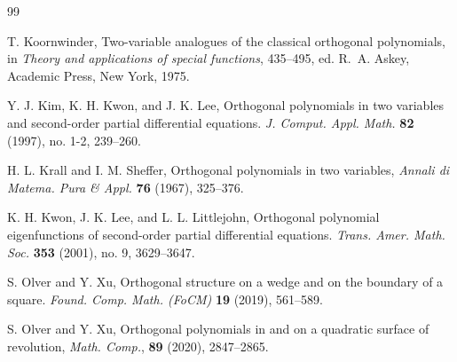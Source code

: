 \documentclass{amsart}
\theoremstyle{remark}
\begin{document}
\begin{thebibliography}{99}
 

        T. Koornwinder, 
        Two-variable analogues of the classical orthogonal polynomials, in 
	\textit{Theory and applications of special functions}, 435--495,  
        ed. R.~A. Askey, Academic Press, New York, 1975.

        Y. J. Kim, K. H. Kwon, and J. K. Lee, 
        Orthogonal polynomials in two variables and second-order partial differential equations.  
        \textit{J. Comput. Appl. Math.} \textbf{82} (1997), no. 1-2, 239--260.

        H. L. Krall and I. M. Sheffer, 
        Orthogonal polynomials in two variables,
        \textit{Annali di Matema. Pura \& Appl.} \textbf{76} (1967), 325--376.


        K. H. Kwon, J. K. Lee, and L. L. Littlejohn, 
        Orthogonal polynomial eigenfunctions of second-order partial differential equations. 
        \textit{Trans. Amer. Math. Soc.} \textbf{353} (2001), no. 9, 3629--3647.

           
       
       S. Olver and Y. Xu,
       Orthogonal structure on a wedge and on the boundary of a square. 
       \textit{Found. Comp. Math. (FoCM)} \textbf{19} (2019), 561--589. 
       
       S. Olver and Y. Xu,
       Orthogonal polynomials in and on a quadratic surface of revolution, 
       \textit{Math. Comp.}, {\bf 89} (2020), 2847--2865.


\end{thebibliography}
\end{document}
